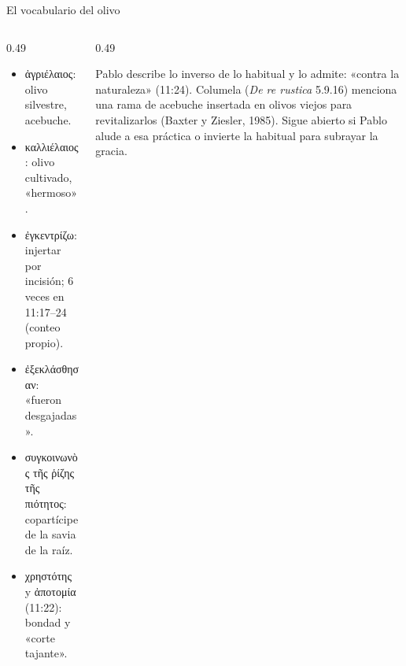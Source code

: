 \documentclass[hyperref={bookmarks=false},aspectratio=169]{beamer}
\newcommand{\grc}[1]{\foreignlanguage{ancientgreek}{#1}}
\newcommand{\notafig}[1]{\par\vspace{2pt}{\fontsize{5}{6}\selectfont\color{sepia}\hfill\textit{Nota.} #1\par}}
\newcommand{\elabpropia}{\notafig{Elaboración propia.}}
\begin{document}
\begin{frame}{El vocabulario del olivo}
\begin{columns}[T,onlytextwidth]
\begin{column}{0.49\textwidth}\small\RaggedRight
\begin{itemize}
\item \grc{ἀγριέλαιος}: olivo silvestre, acebuche.
\item \grc{καλλιέλαιος}: olivo cultivado, «hermoso».
\item \grc{ἐγκεντρίζω}: injertar por incisión; 6 veces en 11:17--24 (conteo propio).
\item \grc{ἐξεκλάσθησαν}: «fueron desgajadas».
\item \grc{συγκοινωνὸς τῆς ῥίζης τῆς πιότητος}: copartícipe de la savia de la raíz.
\item \grc{χρηστότης} y \grc{ἀποτομία} (11:22): bondad y «corte tajante».
\end{itemize}
\end{column}
\begin{column}{0.49\textwidth}
\centering
{}\elabpropia
\begin{notalam}
Pablo describe lo inverso de lo habitual y lo admite: «contra la naturaleza» (11:24). Columela (\emph{De re rustica} 5.9.16) menciona una rama de acebuche insertada en olivos viejos para revitalizarlos (Baxter y Ziesler, 1985). Sigue abierto si Pablo alude a esa práctica o invierte la habitual para subrayar la gracia.
\end{notalam}
\end{column}
\end{columns}
\end{frame}
\end{document}
